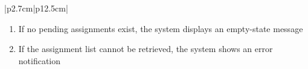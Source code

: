 \begin{table}[H]
\begin{tabular}{|p{2.7cm}|p{12.5cm}|}
\begin{minipage}[t]{\linewidth}
                                      \begin{enumerate}[topsep=0pt,itemsep=1pt,parsep=0pt,partopsep=0pt]
                                          \item If no pending assignments exist, the system displays an empty-state message
                                          \item If the assignment list cannot be retrieved, the system shows an error
                                                notification
                                      \end{enumerate}
                                  \end{minipage}       \\
        \hline
    \end{tabular}
    \label{tab:admin-view-pending-vm-assignments-dup}
\end{table}
